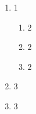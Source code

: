 \begin{enumerate}    
    \item 1
    \begin{enumerate}
        \item 2
        \item 2
        \item 2
    \end{enumerate}
    \item 3
    \item 3
\end{enumerate}